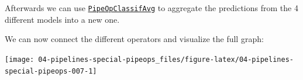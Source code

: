 \documentclass[]{scrbook}
\newenvironment{Shaded}{\begin{snugshade}}{\end{snugshade}}
\newcommand{\DataTypeTok}[1]{\textcolor[rgb]{0.13,0.29,0.53}{#1}}
\newcommand{\DecValTok}[1]{\textcolor[rgb]{0.00,0.00,0.81}{#1}}
\newcommand{\KeywordTok}[1]{\textcolor[rgb]{0.13,0.29,0.53}{\textbf{#1}}}
\newcommand{\NormalTok}[1]{#1}
\newcommand{\OperatorTok}[1]{\textcolor[rgb]{0.81,0.36,0.00}{\textbf{#1}}}
\newcommand{\OtherTok}[1]{\textcolor[rgb]{0.56,0.35,0.01}{#1}}
\newcommand{\StringTok}[1]{\textcolor[rgb]{0.31,0.60,0.02}{#1}}
\renewenvironment{Shaded} {\begin{snugshade}\small} {\end{snugshade}}
\begin{document}
Afterwards we can use \href{https://mlr3pipelines.mlr-org.com/reference/mlr_pipeops_classifavg.html}{\texttt{PipeOpClassifAvg}} to aggregate the predictions from the 4 different models into a new one.

\begin{Shaded}
\end{Shaded}

We can now connect the different operators and visualize the full graph:

\begin{Shaded}
\end{Shaded}

\begin{center}\texttt{[image: 04-pipelines-special-pipeops\_files/figure-latex/04-pipelines-special-pipeops-007-1]} \end{center}

\begin{Shaded}
\end{Shaded}
\end{document}
